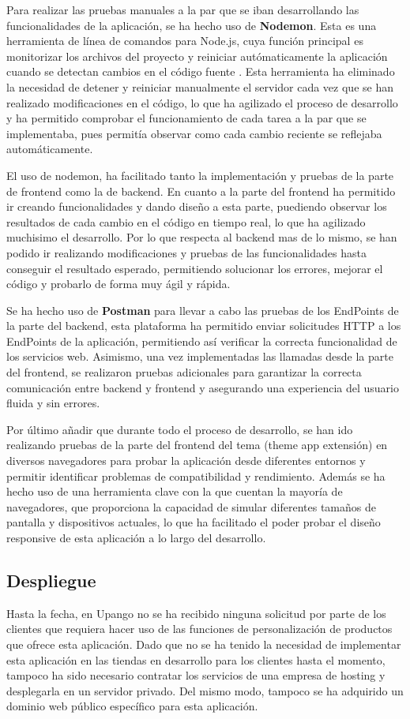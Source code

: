 \documentclass[12pt]{article}
\begin{document}
Para realizar las pruebas manuales a la par que se iban desarrollando las funcionalidades de la aplicación, se ha hecho uso de \textbf{Nodemon}. 
Esta es una herramienta de línea de comandos para Node.js, cuya función principal es monitorizar los archivos del proyecto y reiniciar autómaticamente
la aplicación cuando se detectan cambios en el código fuente \cite{nodemon}. 
Esta herramienta ha eliminado la necesidad de detener y reiniciar manualmente el servidor cada vez que se han realizado modificaciones en el código, 
lo que ha agilizado el proceso de desarrollo y ha permitido comprobar el funcionamiento de cada tarea a la par que se implementaba, pues permitía observar como
cada cambio reciente se reflejaba automáticamente.

El uso de nodemon, ha facilitado tanto la implementación y pruebas de la parte de frontend como la de backend. En cuanto a la parte del frontend
ha permitido ir creando funcionalidades y dando diseño a esta parte, puediendo observar los resultados de cada cambio en el código en tiempo real,
lo que ha agilizado muchisimo el desarrollo. Por lo que respecta al backend mas de lo mismo, se han podido ir realizando modificaciones y pruebas de las funcionalidades
hasta conseguir el resultado esperado, permitiendo solucionar los errores, mejorar el código y probarlo de forma muy ágil y rápida. 

Se ha hecho uso de \textbf{Postman} para llevar a cabo las pruebas de los EndPoints de la parte del backend, esta plataforma ha permitido enviar 
solicitudes HTTP a los EndPoints de la aplicación, permitiendo así verificar la correcta funcionalidad de los servicios web. Asimismo, una vez implementadas
las llamadas desde la parte del frontend, se realizaron pruebas adicionales para garantizar la correcta comunicación entre backend y frontend y asegurando una
experiencia del usuario fluida y sin errores.

Por último añadir que durante todo el proceso de desarrollo, se han ido realizando pruebas de la parte del frontend del tema (theme app extensión) en diversos
navegadores para probar la aplicación desde diferentes entornos y permitir identificar problemas de compatibilidad y rendimiento.
Además se ha hecho uso de una herramienta clave con la que cuentan la mayoría de navegadores, que proporciona la capacidad de simular diferentes 
tamaños de pantalla y dispositivos actuales, lo que ha facilitado el poder probar el diseño responsive de esta aplicación a lo largo del desarrollo.

\subsection{Despliegue}
Hasta la fecha, en Upango no se ha recibido ninguna solicitud por parte de los clientes que requiera hacer uso de las funciones de personalización de productos
que ofrece esta aplicación. Dado que no se ha tenido la necesidad de implementar esta aplicación en las tiendas en desarrollo para los clientes hasta el momento, tampoco ha sido 
necesario contratar los servicios de una empresa de hosting y desplegarla en un servidor privado. Del mismo modo, tampoco se ha adquirido un dominio web público 
específico para esta aplicación.
\end{document}
